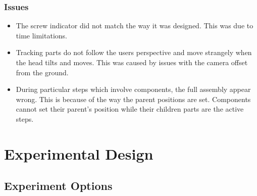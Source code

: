 \documentclass{l4proj}
\begin{document}
\subsection{Issues}

\begin{itemize}
    \item The screw indicator did not match the way it was designed. This was due to time limitations.
    \item Tracking parts do not follow the users perspective and move strangely when the head tilts and moves. This was caused by issues with the camera offset from the ground.
    \item During particular steps which involve components, the full assembly appear wrong. This is because of the way the parent positions are set. Components cannot set their parent's position while their children parts are the active steps.
\end{itemize}


\chapter{Experimental Design}
\label{chap:expdesign}

\section{Experiment Options}
\end{document}
